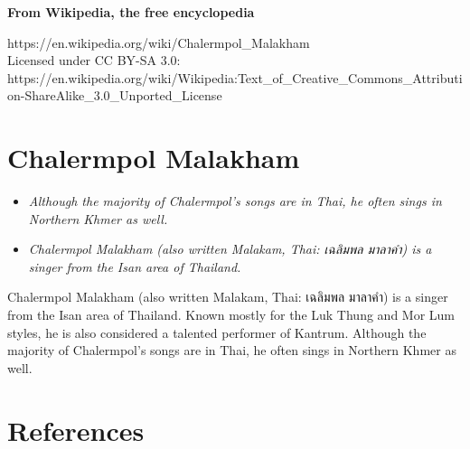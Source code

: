 \textbf{From Wikipedia, the free encyclopedia}

https://en.wikipedia.org/wiki/Chalermpol\_Malakham\\
Licensed under CC BY-SA 3.0:\\
https://en.wikipedia.org/wiki/Wikipedia:Text\_of\_Creative\_Commons\_Attribution-ShareAlike\_3.0\_Unported\_License

\section{Chalermpol Malakham}\label{chalermpol-malakham}

\begin{itemize}
\item
  \emph{Although the majority of Chalermpol's songs are in Thai, he
  often sings in Northern Khmer as well.}
\item
  \emph{Chalermpol Malakham (also written Malakam, Thai: เฉลิมพล มาลาคำ)
  is a singer from the Isan area of Thailand.}
\end{itemize}

Chalermpol Malakham (also written Malakam, Thai: เฉลิมพล มาลาคำ) is a
singer from the Isan area of Thailand. Known mostly for the Luk Thung
and Mor Lum styles, he is also considered a talented performer of
Kantrum. Although the majority of Chalermpol's songs are in Thai, he
often sings in Northern Khmer as well.

\section{References}\label{references}
